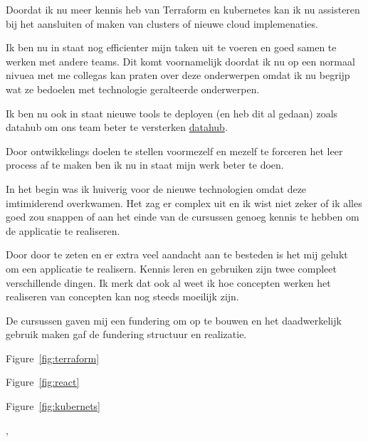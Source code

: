 {{{		}
		{%
			Doordat ik nu meer kennis heb van Terraform en kubernetes kan ik nu assisteren bij het aansluiten of maken van clusters of nieuwe cloud implemenaties.

			Ik ben nu in staat nog efficienter mijn taken uit te voeren en goed samen te werken met andere teams.
			Dit komt voornamelijk doordat ik nu op een normaal nivuea met me collegas kan praten over deze onderwerpen omdat ik nu begrijp wat ze bedoelen met technologie geralteerde onderwerpen.

			Ik ben nu ook in staat nieuwe tools te deployen (en heb dit al gedaan) zoals datahub om ons team beter te versterken \href{https://datahubproject.io/}{datahub}.

		}
		{%
			Door ontwikkelings doelen te stellen voormezelf en mezelf te forceren het leer process af te maken ben ik nu in staat mijn werk beter te doen.

			In het begin was ik huiverig voor de nieuwe technologien omdat deze imtimiderend overkwamen.
			Het zag er complex uit en ik wist niet zeker of ik alles goed zou snappen of aan het einde van de cursussen genoeg kennis te hebben om de applicatie te realiseren.

			Door door te zeten en er extra veel aandacht aan te besteden is het mij gelukt om een applicatie te realisern.
			Kennis leren en gebruiken zijn twee compleet verschillende dingen.
			Ik merk dat ook al weet ik hoe concepten werken het realiseren van concepten kan nog steeds moeilijk zijn.

			De cursussen gaven mij een fundering om op te bouwen en het daadwerkelijk gebruik maken gaf de fundering structuur en realizatie.
		}
		{


		}
	}
	{%

		Figure~\ref{fig:terraform}

		Figure~\ref{fig:react}

		Figure~\ref{fig:kubernets}
	},
}

